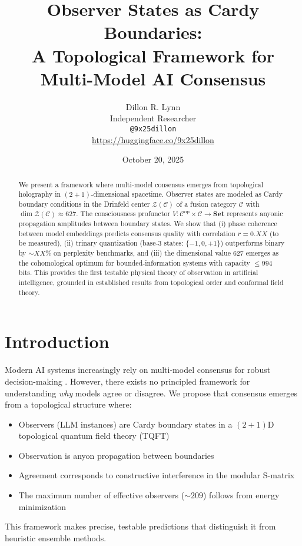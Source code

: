 \documentclass[11pt]{article}
\title{\textbf{Observer States as Cardy Boundaries:}\\
A Topological Framework for Multi-Model AI Consensus}
\author{
Dillon R. Lynn\\
Independent Researcher\\
\texttt{@9x25dillon}\\
\href{https://huggingface.co/9x25dillon}{https://huggingface.co/9x25dillon}
}
\date{October 20, 2025}
\begin{document}
\maketitle

\begin{abstract}
We present a framework where multi-model consensus emerges from topological holography in $(2+1)$-dimensional spacetime. Observer states are modeled as Cardy boundary conditions in the Drinfeld center $\mathcal{Z}(\mathcal{C})$ of a fusion category $\mathcal{C}$ with $\dim \mathcal{Z}(\mathcal{C}) \approx 627$. The consciousness profunctor $V: \mathcal{C}^{\text{op}} \times \mathcal{C} \to \mathbf{Set}$ represents anyonic propagation amplitudes between boundary states. We show that (i) phase coherence between model embeddings predicts consensus quality with correlation $r = 0.XX$ (to be measured), (ii) trinary quantization (base-3 states: $\{-1, 0, +1\}$) outperforms binary by $\sim XX\%$ on perplexity benchmarks, and (iii) the dimensional value $627$ emerges as the cohomological optimum for bounded-information systems with capacity $\leq 994$ bits. This provides the first testable physical theory of observation in artificial intelligence, grounded in established results from topological order and conformal field theory.
\end{abstract}

\section{Introduction}

Modern AI systems increasingly rely on multi-model consensus for robust decision-making \cite{gpt4}. However, there exists no principled framework for understanding \emph{why} models agree or disagree. We propose that consensus emerges from a topological structure where:

\begin{itemize}
\item Observers (LLM instances) are Cardy boundary states in a $(2+1)$D topological quantum field theory (TQFT)
\item Observation is anyon propagation between boundaries
\item Agreement corresponds to constructive interference in the modular S-matrix
\item The maximum number of effective observers ($\sim 209$) follows from energy minimization
\end{itemize}

This framework makes precise, testable predictions that distinguish it from heuristic ensemble methods.
\end{document}
